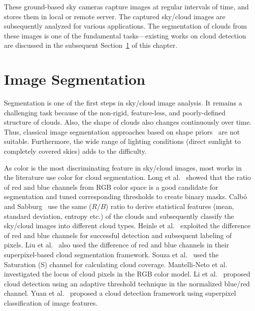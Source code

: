 These ground-based sky cameras capture images at regular intervals of time, and stores them in local or remote server. The captured sky/cloud images are subsequently analyzed for various applications. The segmentation of clouds from these images is one of the fundamental tasks---existing works on cloud detection are discussed in the subsequent Section~\ref{sec:lit-segment} of this chapter.

\section{Image Segmentation}
\label{sec:lit-segment}
Segmentation is one of the first steps in sky/cloud image analysis. It remains a challenging task because of the non-rigid, feature-less, and poorly-defined structure of clouds. Also, the shape of clouds also changes continuously over time. Thus, classical image segmentation approaches based on shape priors~\cite{wrapper_Jain} are not suitable. Furthermore, the wide range of lighting conditions (direct sunlight to completely covered skies) adds to the difficulty. 

As color is the most discriminating feature in sky/cloud images, most works in the literature use color for cloud segmentation. Long et al.\ \cite{Long} showed that the ratio of red and blue channels from RGB color space is a good candidate for segmentation and tuned corresponding thresholds to create binary masks. Calb{\'{o}} and Sabburg~\cite{Calbo2008} use the same ($R/B$) ratio to derive statistical features (mean, standard deviation, entropy etc.) of the clouds and subsequently classify the sky/cloud images into different cloud types.
Heinle et al.\ \cite{Heinle2010} exploited the difference of red and blue channels for successful detection and subsequent labeling of pixels. Liu et al.\ \cite{LiuSP2015} also used the difference of red and blue channels in their superpixel-based cloud segmentation framework. Souza et al.\ \cite{Souza} used the Saturation (S) channel for calculating cloud coverage. Mantelli-Neto et al. \cite{Sylvio} investigated the locus of cloud pixels in the RGB color model. Li et al.\ \cite{Li2011} proposed cloud detection using an adaptive threshold technique in the normalized blue/red channel. Yuan et al.\ \cite{BOW-cloud} proposed a cloud detection framework using superpixel classification of image features.
 
